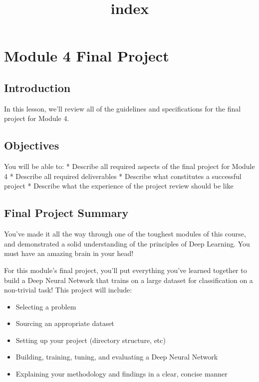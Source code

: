 \documentclass[11pt]{article}
\title{index}
\providecommand{\tightlist}{%
      \setlength{\itemsep}{0pt}\setlength{\parskip}{0pt}}
\begin{document}
    
    
    \maketitle
    
    

    
    \hypertarget{module-4-final-project}{%
\section{Module 4 Final Project}\label{module-4-final-project}}

\hypertarget{introduction}{%
\subsection{Introduction}\label{introduction}}

In this lesson, we'll review all of the guidelines and specifications
for the final project for Module 4.

\hypertarget{objectives}{%
\subsection{Objectives}\label{objectives}}

You will be able to: * Describe all required aspects of the final
project for Module 4 * Describe all required deliverables * Describe
what constitutes a successful project * Describe what the experience of
the project review should be like

    \hypertarget{final-project-summary}{%
\subsection{Final Project Summary}\label{final-project-summary}}

You've made it all the way through one of the toughest modules of this
course, and demonstrated a solid understanding of the principles of Deep
Learning. You must have an amazing brain in your head!

For this module's final project, you'll put everything you've learned
together to build a Deep Neural Network that trains on a large dataset
for classification on a non-trivial task! This project will include:

\begin{itemize}
\tightlist
\item
  Selecting a problem
\item
  Sourcing an appropriate dataset
\item
  Setting up your project (directory structure, etc)
\item
  Building, training, tuning, and evaluating a Deep Neural Network
\item
  Explaining your methodology and findings in a clear, concise manner
\end{itemize}
\end{document}
